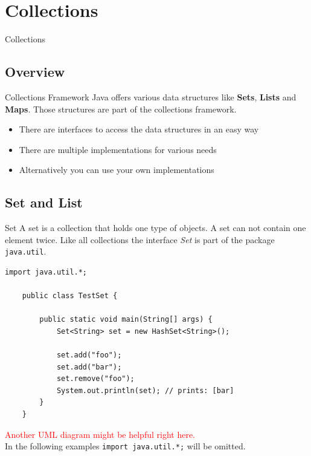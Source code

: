 \section{Collections}
\begin{frame}
	\huge Collections
\end{frame}

\subsection{Overview}
\begin{frame}{Collections Framework}
	Java offers various data structures like \textbf{Sets}, \textbf{Lists} and \textbf{Maps}.
	Those structures are part of the collections framework.
	\pause
	\begin{itemize}
		\item There are interfaces to access the data structures in an easy way
		\item There are multiple implementations for various needs
		\item Alternatively you can use your own implementations
	\end{itemize}
	
\end{frame}

\subsection{Set and List}
\begin{frame}[fragile]{Set}
	A set is a collection that holds one type of objects.
	A set can not contain one element twice.
	Like all collections the interface \emph{Set} is part of the package \texttt{java.util}.
	\begin{lstlisting}[basicstyle=\ttfamily\scriptsize]
	import java.util.*;

	public class TestSet {
	    
	    public static void main(String[] args) {
	        Set<String> set = new HashSet<String>();
	    
	        set.add("foo");
	        set.add("bar");
	        set.remove("foo");
	        System.out.println(set); // prints: [bar]
	    }
	}
	\end{lstlisting}
	\textcolor{red}{Another UML diagram might be helpful right here.}\\
	In the following examples \texttt{import java.util.*;} will be omitted.
\end{frame}

